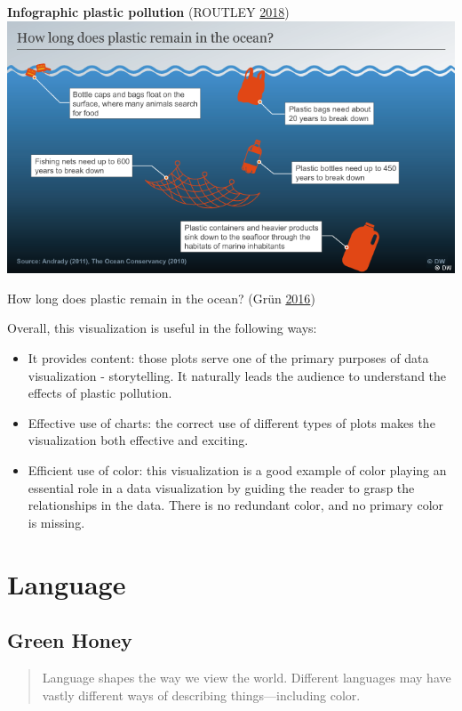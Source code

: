 \documentclass[]{book}
\providecommand{\tightlist}{%
  \setlength{\itemsep}{0pt}\setlength{\parskip}{0pt}}
\begin{document}
\textbf{Infographic plastic pollution} (ROUTLEY \protect\hyperlink{ref-plastic_pollution_infographics}{2018})
\includegraphics{images/ocean_plastic.png}

How long does plastic remain in the ocean? (Grün \protect\hyperlink{ref-plastic_pollution_visualizations}{2016})

Overall, this visualization is useful in the following ways:

\begin{itemize}
\tightlist
\item
  It provides content: those plots serve one of the primary purposes of data visualization - storytelling. It naturally leads the audience to understand the effects of plastic pollution.
\item
  Effective use of charts: the correct use of different types of plots makes the visualization both effective and exciting.
\item
  Efficient use of color: this visualization is a good example of color playing an essential role in a data visualization by guiding the reader to grasp the relationships in the data. There is no redundant color, and no primary color is missing.
\end{itemize}

\hypertarget{language}{%
\section{Language}\label{language}}

\hypertarget{green-honey}{%
\subsection{Green Honey}\label{green-honey}}

\begin{quote}
Language shapes the way we view the world. Different languages may have vastly different ways of describing things---including color.
\end{quote}
\end{document}

